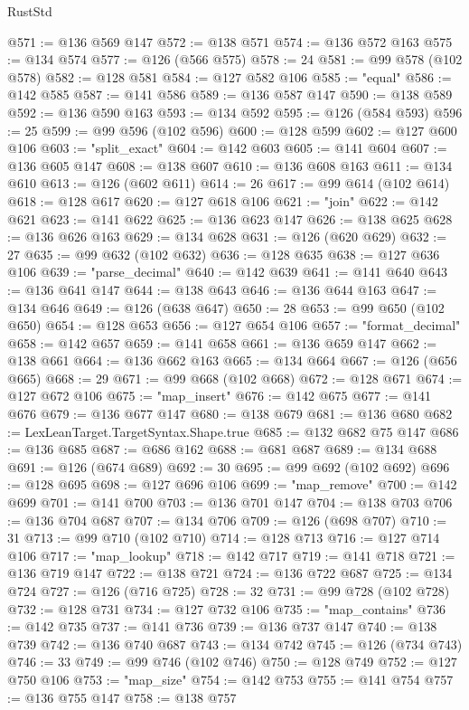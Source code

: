 \begin{lexlean}{RustStd}
\begin{coremodule}
@571 := @136 @569 @147
@572 := @138 @571
@574 := @136 @572 @163
@575 := @134 @574
@577 := @126 (@566 @575)
@578 := 24
@581 := @99 @578 (@102 @578)
@582 := @128 @581
@584 := @127 @582 @106
@585 := "equal"
@586 := @142 @585
@587 := @141 @586
@589 := @136 @587 @147
@590 := @138 @589
@592 := @136 @590 @163
@593 := @134 @592
@595 := @126 (@584 @593)
@596 := 25
@599 := @99 @596 (@102 @596)
@600 := @128 @599
@602 := @127 @600 @106
@603 := "split_exact"
@604 := @142 @603
@605 := @141 @604
@607 := @136 @605 @147
@608 := @138 @607
@610 := @136 @608 @163
@611 := @134 @610
@613 := @126 (@602 @611)
@614 := 26
@617 := @99 @614 (@102 @614)
@618 := @128 @617
@620 := @127 @618 @106
@621 := "join"
@622 := @142 @621
@623 := @141 @622
@625 := @136 @623 @147
@626 := @138 @625
@628 := @136 @626 @163
@629 := @134 @628
@631 := @126 (@620 @629)
@632 := 27
@635 := @99 @632 (@102 @632)
@636 := @128 @635
@638 := @127 @636 @106
@639 := "parse_decimal"
@640 := @142 @639
@641 := @141 @640
@643 := @136 @641 @147
@644 := @138 @643
@646 := @136 @644 @163
@647 := @134 @646
@649 := @126 (@638 @647)
@650 := 28
@653 := @99 @650 (@102 @650)
@654 := @128 @653
@656 := @127 @654 @106
@657 := "format_decimal"
@658 := @142 @657
@659 := @141 @658
@661 := @136 @659 @147
@662 := @138 @661
@664 := @136 @662 @163
@665 := @134 @664
@667 := @126 (@656 @665)
@668 := 29
@671 := @99 @668 (@102 @668)
@672 := @128 @671
@674 := @127 @672 @106
@675 := "map_insert"
@676 := @142 @675
@677 := @141 @676
@679 := @136 @677 @147
@680 := @138 @679
@681 := @136 @680
@682 := LexLeanTarget.TargetSyntax.Shape.true
@685 := @132 @682 @75 @147
@686 := @136 @685
@687 := @686 @162
@688 := @681 @687
@689 := @134 @688
@691 := @126 (@674 @689)
@692 := 30
@695 := @99 @692 (@102 @692)
@696 := @128 @695
@698 := @127 @696 @106
@699 := "map_remove"
@700 := @142 @699
@701 := @141 @700
@703 := @136 @701 @147
@704 := @138 @703
@706 := @136 @704 @687
@707 := @134 @706
@709 := @126 (@698 @707)
@710 := 31
@713 := @99 @710 (@102 @710)
@714 := @128 @713
@716 := @127 @714 @106
@717 := "map_lookup"
@718 := @142 @717
@719 := @141 @718
@721 := @136 @719 @147
@722 := @138 @721
@724 := @136 @722 @687
@725 := @134 @724
@727 := @126 (@716 @725)
@728 := 32
@731 := @99 @728 (@102 @728)
@732 := @128 @731
@734 := @127 @732 @106
@735 := "map_contains"
@736 := @142 @735
@737 := @141 @736
@739 := @136 @737 @147
@740 := @138 @739
@742 := @136 @740 @687
@743 := @134 @742
@745 := @126 (@734 @743)
@746 := 33
@749 := @99 @746 (@102 @746)
@750 := @128 @749
@752 := @127 @750 @106
@753 := "map_size"
@754 := @142 @753
@755 := @141 @754
@757 := @136 @755 @147
@758 := @138 @757

\end{coremodule}
\end{lexlean}
